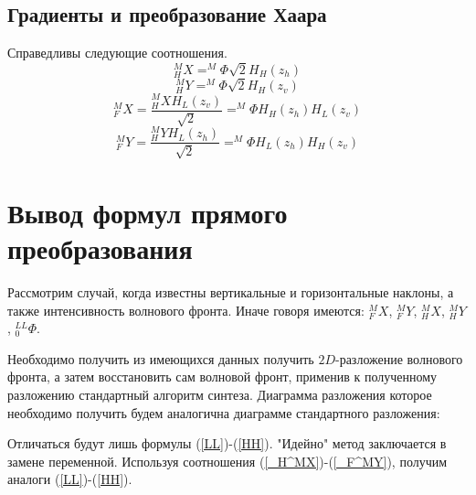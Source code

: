 \documentclass[oneside, final, 14pt]{article}
\begin{document}
\subsection{Градиенты и преобразование Хаара}
Справедливы следующие соотношения.
\begin{equation}\label{_H^MX}
_H^MX = ^M\Phi\sqrt{2}H_H(z_h) 
\end{equation}
\begin{equation}\label{_H^MY}
_H^MY = ^M\Phi\sqrt{2}H_H(z_v)
\end{equation}
\begin{equation}\label{_F^MX}
_F^MX = \frac{_H^MX H_L(z_v)}{\sqrt{2}}=^M\Phi H_H(z_h) H_L(z_v)
\end{equation}
\begin{equation}\label{_F^MY}
_F^MY = \frac{_H^MY H_L(z_h)}{\sqrt{2}}=^M\Phi H_L(z_h) H_H(z_v)
\end{equation}

\section{Вывод формул прямого преобразования}
Рассмотрим случай, когда известны вертикальные и горизонтальные наклоны, а также интенсивность волнового фронта. Иначе говоря имеются: $_F^MX$, $_F^MY$, $_H^MX$, $_H^MY$ , $_0^{LL}\Phi$.

Необходимо получить из имеющихся данных получить $2D$-разложение волнового фронта, а затем восстановить сам волновой фронт, применив к полученному разложению стандартный алгоритм синтеза.\cite{new_method1}
Диаграмма разложения которое необходимо получить будем аналогична диаграмме стандартного разложения:
\begin{center}
\end{center}
Отличаться будут лишь формулы (\ref{LL})-(\ref{HH}). "Идейно" метод заключается в замене переменной. Используя соотношения (\ref{_H^MX})-(\ref{_F^MY}), получим аналоги (\ref{LL})-(\ref{HH}).
\end{document}
